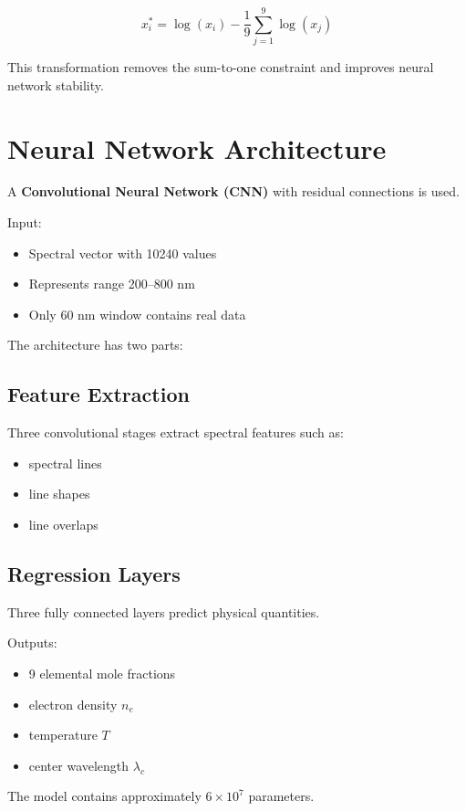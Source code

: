 \documentclass[12pt]{article}
\begin{document}
\begin{equation}
x_i^* = \log(x_i) - \frac{1}{9} \sum_{j=1}^{9} \log(x_j)
\end{equation}

This transformation removes the sum-to-one constraint and improves neural network stability.

\section{Neural Network Architecture}
A \textbf{Convolutional Neural Network (CNN)} with residual connections is used.

Input:

\begin{itemize}
\item Spectral vector with 10240 values
\item Represents range 200–800 nm
\item Only 60 nm window contains real data
\end{itemize}

The architecture has two parts:

\subsection{Feature Extraction}
Three convolutional stages extract spectral features such as:

\begin{itemize}
\item spectral lines
\item line shapes
\item line overlaps
\end{itemize}

\subsection{Regression Layers}
Three fully connected layers predict physical quantities.

Outputs:

\begin{itemize}
\item 9 elemental mole fractions
\item electron density $n_e$
\item temperature $T$
\item center wavelength $\lambda_c$
\end{itemize}

The model contains approximately $6 \times 10^7$ parameters.
\end{document}
